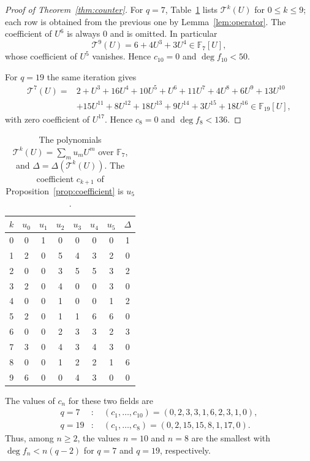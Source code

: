 \documentclass[11pt]{amsart}
\theoremstyle{definition}
\theoremstyle{remark}
\newcommand{\F}{\mathbb{F}}
\newcommand{\cT}{\mathcal{T}}
\begin{document}
\begin{proof}[Proof of Theorem~\ref{thm:counter}]
For $q=7$, Table~\ref{tab:q7} lists $\cT^{k}(U)$ for $0\le k\le9$; each row is obtained from the previous one by Lemma~\ref{lem:operator}. The coefficient of $U^6$ is always $0$ and is omitted. In particular
\[
\cT^{9}(U)=6+4U^3+3U^4\in\F_7[U],
\]
whose coefficient of $U^5$ vanishes. Hence $c_{10}=0$ and $\deg f_{10}<50$.

For $q=19$ the same iteration gives
\begin{align*}
\cT^{7}(U)={}&2+U^3+16U^4+10U^5+U^6+11U^7+4U^8+6U^9+13U^{10}\\
&+15U^{11}+8U^{12}+18U^{13}+9U^{14}+3U^{15}+18U^{16}\in\F_{19}[U],
\end{align*}
with zero coefficient of $U^{17}$. Hence $c_8=0$ and $\deg f_8<136$.
\end{proof}

\begin{table}[ht]
\caption{The polynomials $\cT^{k}(U)=\sum_{m}u_mU^m$ over $\F_7$, and $\Delta=\Delta(\cT^{k}(U))$. The coefficient $c_{k+1}$ of Proposition~\ref{prop:coefficient} is $u_5$.}\label{tab:q7}
\centering
\begin{tabular}{ccccccc c}
\toprule
$k$ & $u_0$ & $u_1$ & $u_2$ & $u_3$ & $u_4$ & $u_5$ & $\Delta$\\
\midrule
0 & 0 & 1 & 0 & 0 & 0 & 0 & 1\\
1 & 2 & 0 & 5 & 4 & 3 & 2 & 0\\
2 & 0 & 0 & 3 & 5 & 5 & 3 & 2\\
3 & 2 & 0 & 4 & 0 & 0 & 3 & 0\\
4 & 0 & 0 & 1 & 0 & 0 & 1 & 2\\
5 & 2 & 0 & 1 & 1 & 6 & 6 & 0\\
6 & 0 & 0 & 2 & 3 & 3 & 2 & 3\\
7 & 3 & 0 & 4 & 3 & 4 & 3 & 0\\
8 & 0 & 0 & 1 & 2 & 2 & 1 & 6\\
9 & 6 & 0 & 0 & 4 & 3 & 0 & 0\\
\bottomrule
\end{tabular}
\end{table}

The values of $c_n$ for these two fields are
\begin{align*}
q=7&:\quad (c_1,\dots,c_{10})=(0,2,3,3,1,6,2,3,1,0),\\
q=19&:\quad (c_1,\dots,c_8)=(0,2,15,15,8,1,17,0).
\end{align*}
Thus, among $n\ge2$, the values $n=10$ and $n=8$ are the smallest with $\deg f_n<n(q-2)$ for $q=7$ and $q=19$, respectively.
\end{document}
